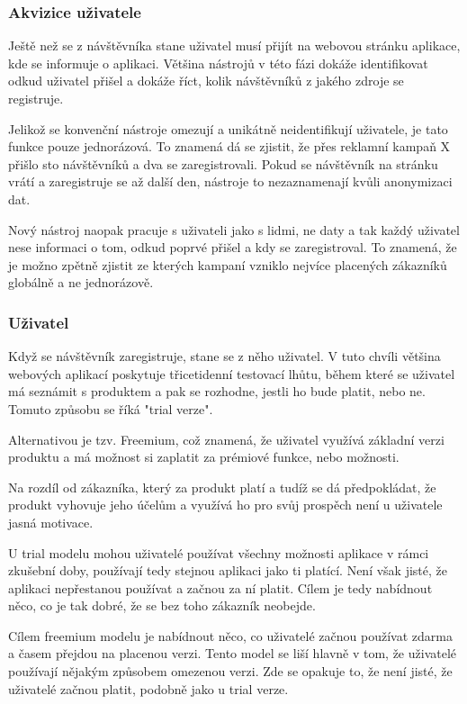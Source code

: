 \documentclass[bc,male,java,dept456]{diploma}						%
\begin{document}
\subsubsection{Akvizice uživatele}

Ještě než se z návštěvníka stane uživatel musí přijít na webovou stránku aplikace, kde se informuje o aplikaci. Většina nástrojů v této fázi dokáže identifikovat odkud uživatel přišel a dokáže říct, kolik návštěvníků z jakého zdroje se registruje.

Jelikož se konvenční nástroje omezují a unikátně neidentifikují uživatele, je tato funkce pouze jednorázová. To znamená dá se zjistit, že přes reklamní kampaň X přišlo sto ná\-vště\-vní\-ků a dva se zaregistrovali. Pokud se návštěvník na stránku vrátí a zaregistruje se až další den, nástroje to nezaznamenají kvůli anonymizaci dat.

Nový nástroj naopak pracuje s uživateli jako s lidmi, ne daty a tak každý uživatel nese informaci o tom, odkud poprvé přišel a kdy se zaregistroval. To znamená, že je možno zpětně zjistit ze kterých kampaní vzniklo nejvíce placených zákazníků globálně a ne jednorázově.

\subsubsection{Uživatel}

Když se návštěvník zaregistruje, stane se z něho uživatel. V tuto chvíli většina webových aplikací poskytuje třicetidenní testovací lhůtu, během které se uživatel má seznámit s produktem a pak se rozhodne, jestli ho bude platit, nebo ne. Tomuto způsobu se říká "trial verze".

Alternativou je tzv. Freemium, což znamená, že uživatel využívá základní verzi produktu a má možnost si zaplatit za prémiové funkce, nebo možnosti.

Na rozdíl od zákazníka, který za produkt platí a tudíž se dá předpokládat, že produkt vyhovuje jeho účelům a využívá ho pro svůj prospěch není u uživatele jasná motivace. 

U trial modelu mohou uživatelé používat všechny možnosti aplikace v rámci zkušební doby, používají tedy stejnou aplikaci jako ti platící. Není však jisté, že aplikaci nepřestanou používat a začnou za ní platit. Cílem je tedy nabídnout něco, co je tak dobré, že se bez toho zákazník neobejde.

Cílem freemium modelu je nabídnout něco, co uživatelé začnou používat zdarma a časem přejdou na placenou verzi. Tento model se liší hlavně v tom, že uživatelé používají nějakým způsobem omezenou verzi. Zde se opakuje to, že není jisté, že uživatelé začnou platit, podobně jako u trial verze.
\end{document}

